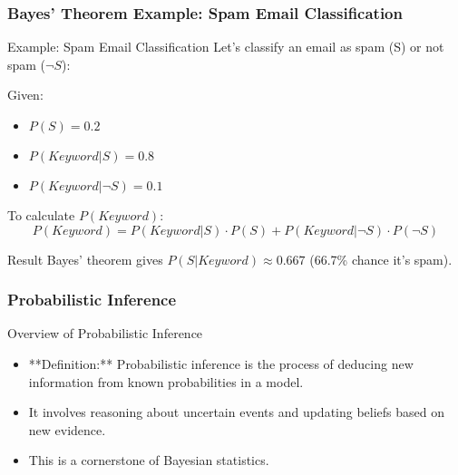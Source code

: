 \documentclass[aspectratio=169]{beamer}
\begin{document}
\begin{frame}[fragile]
    \frametitle{Bayes' Theorem Example: Spam Email Classification}
    \begin{block}{Example: Spam Email Classification}
        Let's classify an email as spam (S) or not spam (\(\neg S\)):
    \end{block}
    Given:
    \begin{itemize}
        \item \(P(S) = 0.2\)
        \item \(P(Keyword | S) = 0.8\)
        \item \(P(Keyword | \neg S) = 0.1\)
    \end{itemize}
    To calculate \(P(Keyword)\):
    \begin{equation}
    P(Keyword) = P(Keyword | S) \cdot P(S) + P(Keyword | \neg S) \cdot P(\neg S)
    \end{equation}
    \begin{block}{Result}
        Bayes' theorem gives \(P(S | Keyword) \approx 0.667\) (66.7\% chance it's spam).
    \end{block}
\end{frame}

\begin{frame}[fragile]
    \frametitle{Probabilistic Inference}
    \begin{block}{Overview of Probabilistic Inference}
        \begin{itemize}
            \item **Definition:** Probabilistic inference is the process of deducing new information from known probabilities in a model.
            \item It involves reasoning about uncertain events and updating beliefs based on new evidence.
            \item This is a cornerstone of Bayesian statistics.
        \end{itemize}
    \end{block}
\end{frame}
\end{document}
